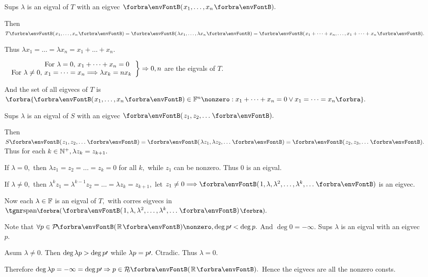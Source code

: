 \par\quad
Sups $\lambda$ is an eigval of $T$ with an eigvec $\Par{x_1,\dots,x_n}.$\par\quad
Then $T\Par{x_1,\dots,x_n}=\Par{\lambda x_1,\dots,\lambda x_n}=\Par{x_1+\dots+x_n,\dots,x_1+\dots+x_n}.$\par\quad
Thus $\lambda x_1=\dots=\lambda x_n=x_1+\dots+x_n.$\par\quad
$\hMath[0pt]{r}{\left.}{\right\}}{$
	For $\lambda=0,$ $x_1+\dots+x_n=0$ $\\$
	For $\lambda\neq 0,$ $x_1=\dots=x_n\Longrightarrow\lambda x_k=n x_k}\Rightarrow0,n$ are the eigvals of $T.$\par\quad
And the set of all eigvecs of $T$ is $\Bra{\Par{x_1,\dots,x_n}\in\Fbb^n\nonzero:x_1+\dots+x_n=0\vee x_1=\dots=x_n}.$\PfEnd
\SepLine

\par\quad
Sups $\lambda$ is an eigval of $S$ with an eigvec $\Par{z_1,z_2,\dots}.$\par\quad
Then $S\Par{z_1,z_2,\dots}=\Par{\lambda z_1,\lambda z_2,\dots}=\Par{z_2,z_3,\dots}.$ Thus for each $k\in{\mathbb{N}^+},\lambda z_k=z_{k+1}.$\par\quad
If $\lambda=0,$ then $\lambda z_1=z_2=\dots=z_k=0$ for all $k,$ while $z_1$ can be nonzero. Thus $0$ is an eigval.\par\quad
If $\lambda\neq 0,$ then $\lambda^k z_1=\lambda^{k-1} z_2=\dots=\lambda z_k=z_{k+1},$ let $z_1\neq 0\Longrightarrow\Par{1,\lambda,\lambda^2,\dots,\lambda^k,\dots}$ is an eigvec.\par\quad
Now each $\lambda\in{\mathbb{F}}$ is an eigval of $T,$ with corres eigvecs in $\Span[\BigPar]{\Par{1,\lambda,\lambda^2,\dots,\lambda^k,\dots}}.$\PfEnd
\SepLine\pagebreak

\par\quad
Note that $\forall p\in\PoRi\nonzero,\deg p\apostrophe<\deg p.$ And $\deg 0=-\infty.$ Sups $\lambda$ is an eigval with an eigvec $p.$\par\quad
Asum $\lambda\neq 0.$ Then $\deg\lambda p>\deg p\prime$ while $\lambda p=p\prime.$ Ctradic. Thus $\lambda=0.$\par\quad
Therefore $\deg \lambda p=-\infty=\deg p\apostrophe\Rightarrow p\in\PoR{0}.$ Hence the eigvecs are all the nonzero consts.\PfEnd
\SepLine

